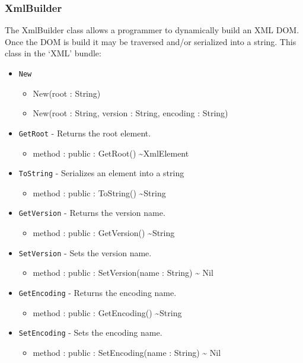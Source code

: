 \documentclass[11pt]{article}
\begin{document}
\subsubsection{XmlBuilder}
The XmlBuilder class allows a programmer to dynamically build an XML
DOM.  Once the DOM is build it may be traversed and/or serialized into
a string. This class in the `XML' bundle:
\begin{itemize}
\item \texttt{New}
  \begin{itemize}
  \item New(root : String)
  \item New(root : String, version : String, encoding : String)
  \end{itemize}
\item \texttt{GetRoot} - Returns the root element.
  \begin{itemize}
  \item method : public : GetRoot() \textasciitilde XmlElement
  \end{itemize}
\item \texttt{ToString} - Serializes an element into a string
  \begin{itemize}
  \item method : public : ToString() \textasciitilde String
  \end{itemize}
\item \texttt{GetVersion} - Returns the version name.
  \begin{itemize}
  \item method : public : GetVersion() \textasciitilde String
  \end{itemize}
\item \texttt{SetVersion} - Sets the version name.
  \begin{itemize}
  \item method : public : SetVersion(name : String) \textasciitilde
    Nil
  \end{itemize}
\item \texttt{GetEncoding} - Returns the encoding name.
  \begin{itemize}
  \item method : public : GetEncoding() \textasciitilde String
  \end{itemize}
\item \texttt{SetEncoding} - Sets the encoding name.
  \begin{itemize}
  \item method : public : SetEncoding(name : String) \textasciitilde
    Nil
  \end{itemize}
\end{itemize}
\end{document}
